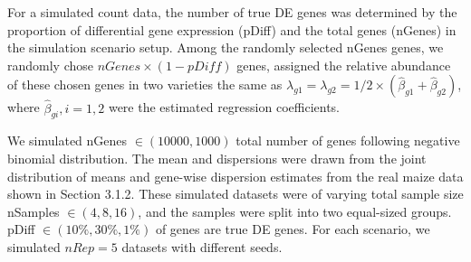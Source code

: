 For a simulated count data, the number of true DE genes was determined by the proportion of differential gene expression (pDiff) and the total genes (nGenes) in the simulation scenario setup. Among the randomly selected nGenes genes, we randomly chose $nGenes \times (1-pDiff)$ genes, assigned the relative abundance of these chosen genes in two varieties the same as $\lambda_{g1} = \lambda_{g2} = 1/2\times(\hat{\beta}_{g1} + \hat{\beta}_{g2})$, where $\hat{\beta}_{gi}, i=1,2$ were the estimated regression coefficients.

We simulated nGenes $\in (10000, 1000)$ total number of genes following negative binomial distribution. The mean and dispersions were drawn from the joint distribution of means and gene-wise dispersion estimates from the real maize data \citep{paschold2012complementation} shown in Section 3.1.2. These simulated datasets were of varying total sample size nSamples $\in {(4,8,16)}$, and the samples were split into two equal-sized groups. pDiff $\in {(10\%, 30\%, 1\%)}$ of genes are true DE genes. For each scenario, we simulated $nRep = 5$ datasets with different seeds.









